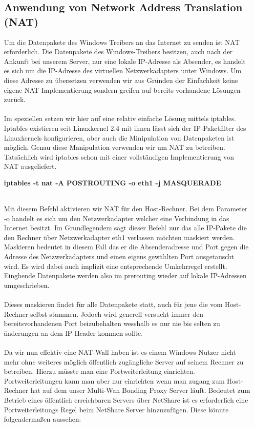 \subsection{Anwendung von Network Address Translation (NAT)}
Um die Datenpakete des Windows Treibers an das Internet zu senden ist NAT erforderlich. Die Datenpakete des Windows-Treibers besitzen, auch nach der Ankunft bei unserem Server, nur eine lokale IP-Adresse als Absender, es handelt es sich um die IP-Adresse des virtuellen Netzwerkadapters unter Windows. Um diese Adresse zu übersetzen verwenden wir aus Gründen der Einfachkeit keine eigene NAT Implementierung sondern greifen auf bereits vorhandene Lösungen zurück. 
\\\\ 
Im speziellen setzen wir hier auf eine relativ einfache Lösung mittels iptables.
Iptables existieren seit Linuxkernel 2.4 mit ihnen lässt sich der IP-Paketfilter des Linuxkernels konfigurieren, aber auch die Minipulation von Datenpaketen ist möglich. Genau diese Manipulation verwenden wir um NAT zu betreiben. Tatsächlich wird iptables schon mit einer vollständigen Implementierung von NAT ausgeliefert.
\\ %
\begin{center}
    \textbf{iptables -t nat -A POSTROUTING -o eth1 -j MASQUERADE}
\end{center}
\ \\ 
Mit diesem Befehl aktivieren wir NAT für den Host-Rechner. Bei dem Parameter -o handelt es sich um den Netzwerkadapter welcher eine Verbindung in das Internet besitzt. Im Grundlegendem sagt dieser Befehl nur das alle IP-Pakete die den Rechner über Netzwerkadapter eth1 verlassen möchten maskiert werden. Maskieren bedeutet in diesem Fall das er die Absenderadresse und Port gegen die Adresse des Netzwerkadapters und einen eigens gewählten Port ausgetauscht wird. Es wird dabei auch implizit eine entsprechende Umkehrregel erstellt. Einghende Datenpakete werden also im prerouting wieder auf lokale IP-Adressen umgeschrieben. %
\\\\
Dieses maskieren findet für alle Datenpakete statt, auch für jene die vom Host-Rechner selbst stammen. Jedoch wird generell versucht immer den bereitsvorhandenen Port beizubehalten wesshalb es nur nie bis selten zu änderungen an dem IP-Header kommen sollte.
\\\\ 
Da wir nun effektiv eine NAT-Wall haben ist es einem Windows Nutzer nicht mehr ohne weiteres möglich öffentlich zugängliche Server auf seinem Rechner zu betreiben. Hierzu müsste man eine Portweiterleitung einrichten. Portweiterleitungen kann man aber nur einrichten wenn man zugang zum Host-Rechner hat auf dem unser Multi-Wan Bonding Proxy Server läuft. Bedeutet zum Betrieb eines öffentlich erreichbaren Servers über NetShare ist es erforderlich eine Portweiterleitungs Regel beim NetShare Server hinzuzufügen. Diese könnte folgendermaßen aussehen:
